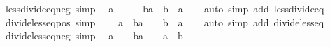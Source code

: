 \begin{isabellebody}
\endisatagproof
{\isafoldproof}%
%
\isadelimproof
\isanewline
%
\endisadelimproof
\isanewline
{}\isamarkupfalse%
\ less{\isacharunderscore}{\kern0pt}divide{\isacharunderscore}{\kern0pt}eq{\isacharunderscore}{\kern0pt}{}{\isacharunderscore}{\kern0pt}neg\ {\isacharbrackleft}{\kern0pt}simp{\isacharbrackright}{\kern0pt}{\isacharcolon}{\kern0pt}\isanewline
\ \ {\isachardoublequoteopen}a\ {\isacharless}{\kern0pt}\ {}\ {\isasymLongrightarrow}\ {\isacharparenleft}{\kern0pt}{}\ {\isacharless}{\kern0pt}\ b{\isacharslash}{\kern0pt}a{\isacharparenright}{\kern0pt}\ {\isacharequal}{\kern0pt}\ {\isacharparenleft}{\kern0pt}b\ {\isacharless}{\kern0pt}\ a{\isacharparenright}{\kern0pt}{\isachardoublequoteclose}\isanewline
%
\isadelimproof
\ \ %
\endisadelimproof
%
\isatagproof
{}\isamarkupfalse%
\ {\isacharparenleft}{\kern0pt}auto\ simp\ add{\isacharcolon}{\kern0pt}\ less{\isacharunderscore}{\kern0pt}divide{\isacharunderscore}{\kern0pt}eq{\isacharparenright}{\kern0pt}%
\endisatagproof
{\isafoldproof}%
%
\isadelimproof
\isanewline
%
\endisadelimproof
\isanewline
{}\isamarkupfalse%
\ divide{\isacharunderscore}{\kern0pt}less{\isacharunderscore}{\kern0pt}eq{\isacharunderscore}{\kern0pt}{}{\isacharunderscore}{\kern0pt}pos\ {\isacharbrackleft}{\kern0pt}simp{\isacharbrackright}{\kern0pt}{\isacharcolon}{\kern0pt}\isanewline
\ \ {\isachardoublequoteopen}{}\ {\isacharless}{\kern0pt}\ a\ {\isasymLongrightarrow}\ {\isacharparenleft}{\kern0pt}b{\isacharslash}{\kern0pt}a\ {\isacharless}{\kern0pt}\ {}{\isacharparenright}{\kern0pt}\ {\isacharequal}{\kern0pt}\ {\isacharparenleft}{\kern0pt}b\ {\isacharless}{\kern0pt}\ a{\isacharparenright}{\kern0pt}{\isachardoublequoteclose}\isanewline
%
\isadelimproof
\ \ %
\endisadelimproof
%
\isatagproof
{}\isamarkupfalse%
\ {\isacharparenleft}{\kern0pt}auto\ simp\ add{\isacharcolon}{\kern0pt}\ divide{\isacharunderscore}{\kern0pt}less{\isacharunderscore}{\kern0pt}eq{\isacharparenright}{\kern0pt}%
\endisatagproof
{\isafoldproof}%
%
\isadelimproof
\isanewline
%
\endisadelimproof
\isanewline
{}\isamarkupfalse%
\ divide{\isacharunderscore}{\kern0pt}less{\isacharunderscore}{\kern0pt}eq{\isacharunderscore}{\kern0pt}{}{\isacharunderscore}{\kern0pt}neg\ {\isacharbrackleft}{\kern0pt}simp{\isacharbrackright}{\kern0pt}{\isacharcolon}{\kern0pt}\isanewline
\ \ {\isachardoublequoteopen}a\ {\isacharless}{\kern0pt}\ {}\ {\isasymLongrightarrow}\ b{\isacharslash}{\kern0pt}a\ {\isacharless}{\kern0pt}\ {}\ {\isasymlongleftrightarrow}\ a\ {\isacharless}{\kern0pt}\ b{\isachardoublequoteclose}\isanewline

\end{isabellebody}
